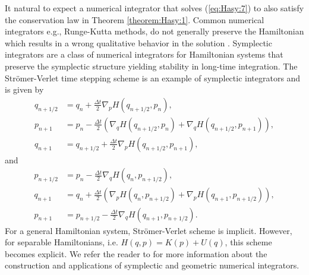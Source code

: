{\edit It natural to expect a numerical integrator that solves (\ref{eq:Hasy:7}) to also satisfy the conservation law in Theorem \ref{theorem:Hasy:1}. Common numerical integrators e.g., Runge-Kutta methods, do not generally preserve the Hamiltonian which results in a wrong qualitative behavior in the solution \cite{Hairer:1250576}. Symplectic integrators are a class of numerical integrators for Hamiltonian systems that preserve the symplectic structure yielding stability in long-time integration.} The Str\"omer-Verlet time stepping scheme is an example of symplectic integrators and is given by
\begin{equation} \label{eq:Hasy:13}
\begin{aligned}
	q_{n+1/2} &= q_n + \frac{\Delta t}{2} \nabla_pH(q_{n+1/2},p_n), \\
	p_{n+1} &= p_n - \frac{\Delta t}{2} \left( \nabla_qH(q_{n+1/2},p_n) + \nabla_qH(q_{n+1/2},p_{n+1}) \right),\\
	q_{n+1} &= q_{n+1/2} + \frac{\Delta t}{2} \nabla_pH(q_{n+1/2},p_{n+1}),
\end{aligned}
\end{equation}
and
\begin{equation} \label{eq:Hasy:14}
\begin{aligned}
	p_{n+1/2} &= p_n - \frac{\Delta t}{2} \nabla_qH(q_{n},p_{n+1/2}), \\
	q_{n+1} &= q_n + \frac{\Delta t}{2} \left( \nabla_pH(q_{n},p_{n+1/2}) + \nabla_pH(q_{n+1},p_{n+1/2}) \right),\\
	p_{n+1} &= p_{n+1/2} - \frac{\Delta t}{2} \nabla_qH(q_{n+1},p_{n+1/2}).
\end{aligned}
\end{equation}
For a general Hamiltonian system, Str\"omer-Verlet scheme is implicit. However, for separable Hamiltonians, i.e. $H(q,p) = K(p) + U(q)$, this {\edit scheme becomes} explicit. We refer the reader to \cite{Hairer:1250576} for more information about the construction and applications of symplectic and geometric numerical integrators. 
